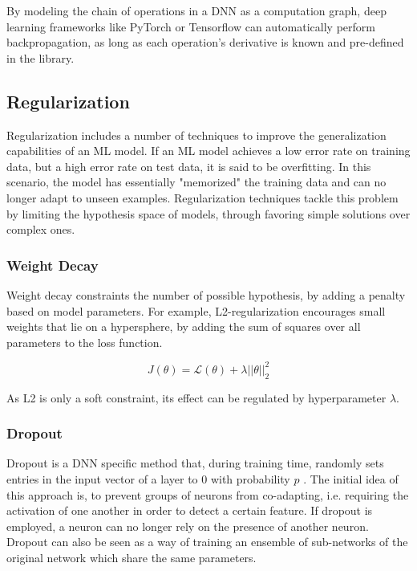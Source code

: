 By modeling the chain of operations in a DNN as a computation graph, deep learning frameworks like PyTorch \cite{NEURIPS2019_9015} or Tensorflow \cite{tensorflow2015-whitepaper} can automatically perform backpropagation, as long as each operation's derivative is known and pre-defined in the library.

\subsection{Regularization}
Regularization includes a number of techniques to improve the generalization capabilities of an ML model. If an ML model achieves a low error rate on training data, but a high error rate on test data, it is said to be overfitting. In this scenario, the model has essentially "memorized" the training data and can no longer adapt to unseen examples. Regularization techniques tackle this problem by limiting the hypothesis space of models, through favoring simple solutions over complex ones.

\subsubsection{Weight Decay}
Weight decay constraints the number of possible hypothesis, by adding a penalty based on model parameters. For example, L2-regularization encourages small weights that lie on a hypersphere, by adding the sum of squares over all parameters to the loss function.

\begin{equation}
    J(\theta) = \mathcal{L}(\theta) + \lambda ||\theta||_2^2
\end{equation}

As L2 is only a soft constraint, its effect can be regulated by hyperparameter $\lambda$.

\subsubsection{Dropout}
Dropout is a DNN specific method that, during training time, randomly sets entries in the input vector of a layer to $0$ with probability $p$ \cite{DBLP:journals/corr/abs-1207-0580}. The initial idea of this approach is, to prevent groups of neurons from co-adapting, i.e. requiring the activation of one another in order to detect a certain feature. If dropout is employed, a neuron can no longer rely on the presence of another neuron. Dropout can also be seen as a way of training an ensemble of sub-networks of the original network which share the same parameters.


